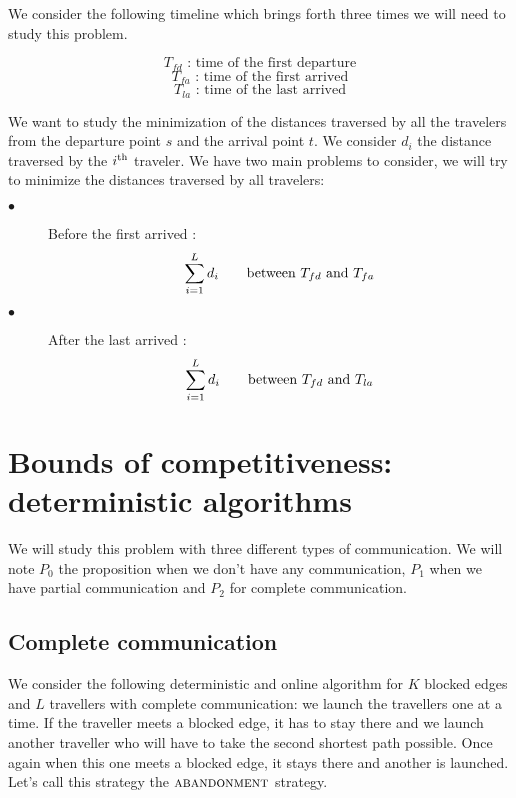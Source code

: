 \documentclass[letter-size, 11pt]{article}
\newcommand{\ith}[1]{#1^{\mbox{\scriptsize{th}}}}
\begin{document}
We consider the following timeline which brings forth three times we will need to study this problem.
\begin{center}
\end{center}
\[
T_{fd} \mbox{\ : time of the first departure}
\]
\[
T_{fa} \mbox{\ : time of the first arrived}
\]
\[
T_{la} \mbox{\ : time of the last arrived}
\]

We want to study the minimization of the distances traversed by all the travelers from the departure point $s$ and the arrival point $t$. We consider $d_i$ the distance traversed by the $\ith{i}$ traveler. We have two main problems to consider, we will try to minimize the distances traversed by all travelers:
\begin{description}
\item[$\bullet$] Before the first arrived :
\[ 
\sum_{i=1}^{L} d_{i} \mbox{\qquad between } T_{fd} \mbox{\ and } T_{fa}
\]
\item[$\bullet$] After the last arrived :
\[ 
\sum_{i=1}^{L} d_{i} \mbox{\qquad between } T_{fd} \mbox{\ and } T_{la}
\]
\end{description}



\section{Bounds of competitiveness: deterministic algorithms}

We will study this problem with three different types of communication. We will note $P_0$ the proposition when we don't have any communication, $P_1$ when we have partial communication and $P_2$ for complete communication.

\subsection{Complete communication}

We consider the following deterministic and online algorithm for $K$ blocked edges and $L$ travellers with complete communication: we launch the travellers one at a time. If the traveller meets a blocked edge, it has to stay there and we launch another traveller who will have to take the second shortest path possible. Once again when this one meets a blocked edge, it stays there and another is launched. Let's call this strategy the $\textsc{abandonment}$ strategy.
\end{document}
